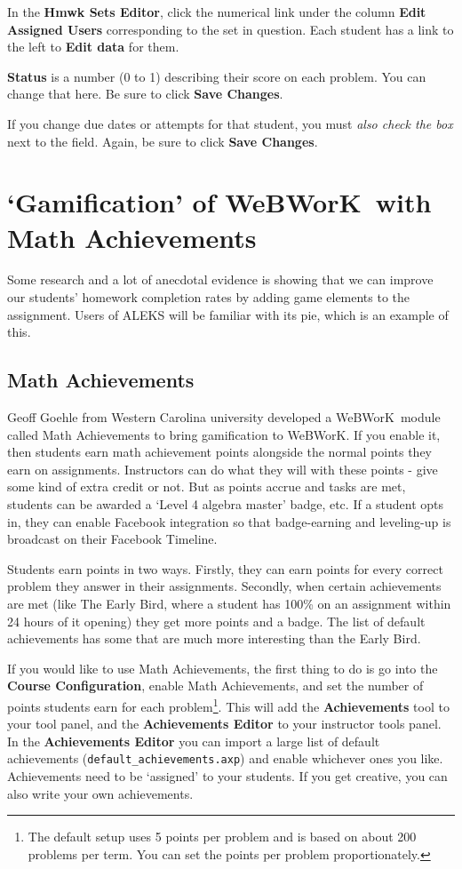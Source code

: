 \documentclass[12pt]{article}
\newcommand{\menu}[1]{\textbf{#1}}
\newcommand{\WW}{WeBWorK}
\newcommand{\HSE}{\menu{Hmwk Sets Editor}}
\begin{document}
In the \HSE, click the numerical link under the column \menu{Edit Assigned Users} corresponding to the set in question.  Each student has a link to the left to \menu{Edit data} for them.

\menu{Status} is a number (0 to 1) describing their score on each problem.  You can change that here.  Be sure to click \menu{Save Changes}.

If you change due dates or attempts for that student, you must \emph{also check the box} next to the field.  Again, be sure to click \menu{Save Changes}.

\section{`Gamification' of \WW\ with Math Achievements}\label{gamification}

Some research and a lot of anecdotal evidence is showing that we can improve our students' homework completion rates by adding game elements to the assignment. Users of ALEKS will be familiar with its pie, which is an example of this.

\subsection{Math Achievements}

Geoff Goehle from Western Carolina university developed a \WW\ module called Math Achievements to bring gamification to \WW. If you enable it, then students earn math achievement points alongside the normal points they earn on assignments. Instructors can do what they will with these points - give some kind of extra credit or not. But as points accrue and tasks are met, students can be awarded a `Level 4 algebra master' badge, etc. If a student opts in, they can enable Facebook integration so that badge-earning and leveling-up is broadcast on their Facebook Timeline. 

Students earn points in two ways. Firstly, they can earn points for every correct problem they answer in their assignments. Secondly, when certain achievements are met (like The Early Bird, where a student has 100\% on an assignment within 24 hours of it opening) they get more points and a badge. The list of default achievements has some that are much more interesting than the Early Bird.  

If you would like to use Math Achievements, the first thing to do is go into the \menu{Course Configuration}, enable Math Achievements, and set the number of points students earn for each problem\footnote{The default setup uses 5 points per problem and is based on about 200 problems per term. You can set the points per problem proportionately.}. This will add the \menu{Achievements} tool to your tool panel, and the \menu{Achievements Editor} to your instructor tools panel. In the \menu{Achievements Editor} you can import a large list of default achievements (\verb=default_achievements.axp=) and enable whichever ones you like. Achievements need to be `assigned' to your students. If you get creative, you can also write your own achievements.
\end{document}
